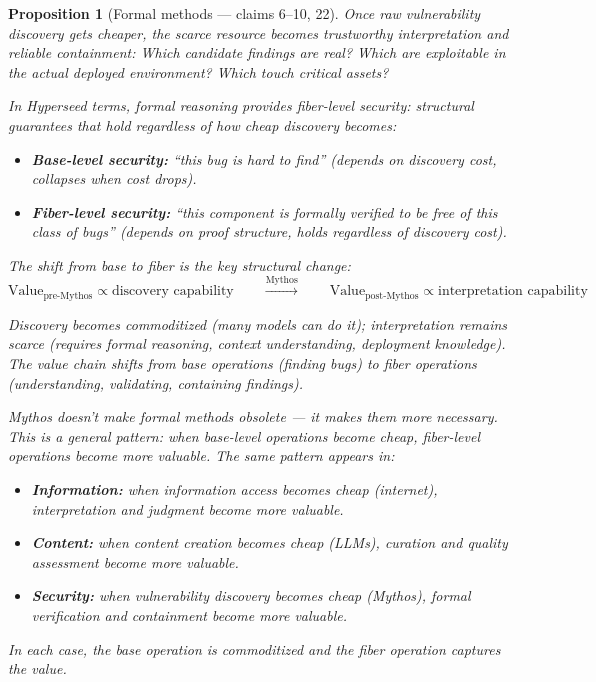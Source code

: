\documentclass[11pt,a4paper]{article}
\newtheorem{proposition}[definition]{Proposition}
\begin{document}
\begin{proposition}[Formal methods --- claims 6--10, 22]
\label{prop:formal-v1}
Once raw vulnerability discovery gets cheaper, the scarce resource
becomes trustworthy interpretation and reliable containment: Which
candidate findings are real? Which are exploitable in the actual
deployed environment? Which touch critical assets?

In Hyperseed terms, formal reasoning provides \emph{fiber-level
security}: structural guarantees that hold regardless of how cheap
discovery becomes:
\begin{itemize}
\item \textbf{Base-level security:} ``this bug is hard to find''
  (depends on discovery cost, collapses when cost drops).
\item \textbf{Fiber-level security:} ``this component is formally
  verified to be free of this class of bugs'' (depends on proof
  structure, holds regardless of discovery cost).
\end{itemize}

The shift from base to fiber is the key structural change:
\[
  \text{Value}_{\text{pre-Mythos}} \propto \text{discovery capability}
  \qquad \xrightarrow{\text{Mythos}} \qquad
  \text{Value}_{\text{post-Mythos}} \propto \text{interpretation capability}
\]

Discovery becomes commoditized (many models can do it); interpretation
remains scarce (requires formal reasoning, context understanding,
deployment knowledge). The value chain shifts from base operations
(finding bugs) to fiber operations (understanding, validating,
containing findings).

Mythos doesn't make formal methods obsolete --- it makes them more
necessary. This is a general pattern: when base-level operations
become cheap, fiber-level operations become more valuable. The
same pattern appears in:
\begin{itemize}
\item \textbf{Information:} when information access becomes cheap
  (internet), interpretation and judgment become more valuable.
\item \textbf{Content:} when content creation becomes cheap (LLMs),
  curation and quality assessment become more valuable.
\item \textbf{Security:} when vulnerability discovery becomes cheap
  (Mythos), formal verification and containment become more valuable.
\end{itemize}

In each case, the base operation is commoditized and the fiber
operation captures the value.
\end{proposition}
\end{document}
